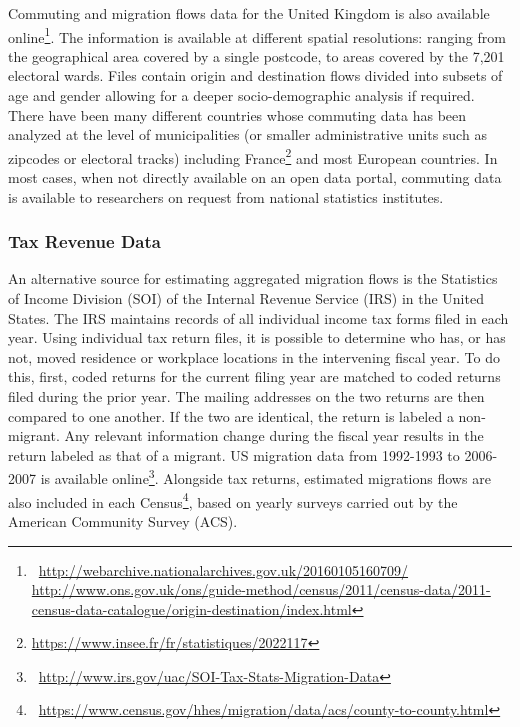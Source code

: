 Commuting and migration flows data for the United Kingdom is also available online\footnote{~\url{http://webarchive.nationalarchives.gov.uk/20160105160709/}\\ \url{http://www.ons.gov.uk/ons/guide-method/census/2011/census-data/2011-census-data-catalogue/origin-destination/index.html}}. The information is available at different spatial resolutions: ranging from the geographical area covered by a single postcode, to areas covered by the 7,201 electoral wards. Files contain origin and destination flows divided into subsets of age and gender allowing for a deeper socio-demographic analysis if required. There have been many different countries whose commuting data has been analyzed at the level of municipalities (or smaller administrative units such as zipcodes or electoral tracks) including France\footnote{\url{https://www.insee.fr/fr/statistiques/2022117}} and most European countries. In most cases, when not directly available on an open data portal, commuting data is available to researchers on request from national statistics institutes.


\subsubsection{Tax Revenue Data}

An alternative source for estimating aggregated migration flows is the Statistics of Income Division (SOI) of the Internal Revenue Service (IRS) in the United States. The IRS maintains records of all individual income tax forms filed in each year. Using individual tax return files, it is possible to determine who has, or has not, moved residence or workplace locations in the intervening fiscal year. To do this, first, coded returns for the current filing year are matched to coded returns filed during the prior year. The mailing addresses on the two returns are then compared to one another. If the two are identical, the return is labeled a non-migrant. Any relevant information change during the fiscal year results in the return labeled as that of a migrant. US migration data from 1992-1993 to 2006-2007 is available online\footnote{~\url{http://www.irs.gov/uac/SOI-Tax-Stats-Migration-Data}}. Alongside tax returns, estimated migrations flows are also included in each Census\footnote{~\url{https://www.census.gov/hhes/migration/data/acs/county-to-county.html}}, based on yearly surveys carried out by the American Community Survey (ACS).

